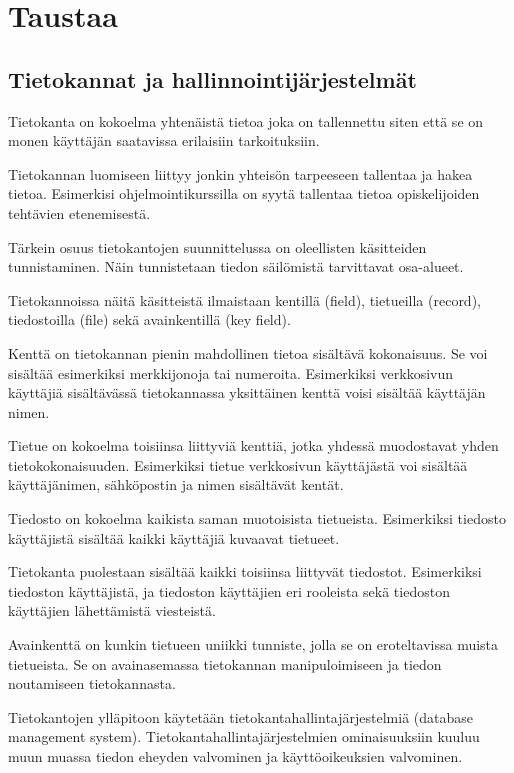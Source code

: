 \documentclass[finnish,twoside,openright]{HYgraduMLDS}
\begin{document}
\chapter{Taustaa}

\section{Tietokannat ja hallinnointijärjestelmät}

Tietokanta on kokoelma yhtenäistä tietoa joka on tallennettu siten että se on monen käyttäjän saatavissa erilaisiin tarkoituksiin\cite{pathak2007dbms}.

Tietokannan luomiseen liittyy jonkin yhteisön tarpeeseen tallentaa ja hakea tietoa\cite{tikape2019}. Esimerkisi ohjelmointikurssilla on syytä tallentaa tietoa opiskelijoiden tehtävien etenemisestä.

Tärkein osuus tietokantojen suunnittelussa on oleellisten käsitteiden tunnistaminen. Näin tunnistetaan tiedon säilömistä tarvittavat osa-alueet\cite{tikape2019}. 

Tietokannoissa näitä käsitteistä ilmaistaan kentillä (field), tietueilla (record), tiedostoilla (file) sekä avainkentillä (key field)\cite{pathak2007dbms}.

Kenttä on tietokannan pienin mahdollinen tietoa sisältävä kokonaisuus. Se voi sisältää esimerkiksi merkkijonoja tai numeroita. Esimerkiksi verkkosivun käyttäjiä sisältävässä tietokannassa yksittäinen kenttä voisi sisältää käyttäjän nimen.

Tietue on kokoelma toisiinsa liittyviä kenttiä, jotka yhdessä muodostavat yhden tietokokonaisuuden. Esimerkiksi tietue verkkosivun käyttäjästä voi sisältää käyttäjänimen, sähköpostin ja nimen sisältävät kentät.

Tiedosto on kokoelma kaikista saman muotoisista tietueista. Esimerkiksi tiedosto käyttäjistä sisältää kaikki käyttäjiä kuvaavat tietueet.

Tietokanta puolestaan sisältää kaikki toisiinsa liittyvät tiedostot. Esimerkiksi tiedoston käyttäjistä, ja tiedoston käyttäjien eri rooleista sekä tiedoston käyttäjien lähettämistä viesteistä.

Avainkenttä on kunkin tietueen uniikki tunniste, jolla se on eroteltavissa muista tietueista. Se on avainasemassa tietokannan manipuloimiseen ja tiedon noutamiseen tietokannasta.

Tietokantojen ylläpitoon käytetään tietokantahallintajärjestelmiä (database management system). Tietokantahallintajärjestelmien ominaisuuksiin kuuluu muun muassa tiedon eheyden valvominen ja käyttöoikeuksien valvominen\cite{tikape2019}. 
\end{document}
